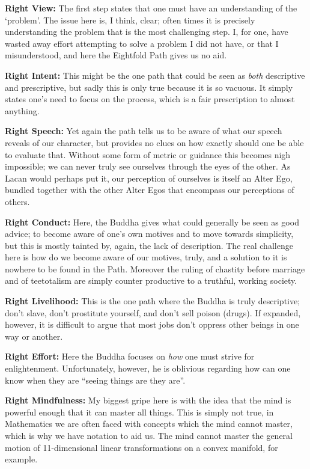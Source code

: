 \documentclass[12pt,letterpaper]{article}
\begin{document}
\begin{spacing}{2}
    \textbf{Right View:} The first step states that one must have an
    understanding of the `problem'. The issue here is, I think, clear; often
    times it is precisely understanding the problem that is the most challenging
    step. I, for one, have wasted away effort attempting to solve a problem I
    did not have, or that I misunderstood, and here the Eightfold Path gives us
    no aid.

    \textbf{Right Intent:} This might be the one path that could be seen as
    \emph{both} descriptive and prescriptive, but sadly this is only true
    because it is so vacuous. It simply states one's need to focus on the
    process, which is a fair prescription to almost anything.

    \textbf{Right Speech:} Yet again the path tells us to be aware of what our
    speech reveals of our character, but provides no clues on how exactly should
    one be able to evaluate that. Without some form of metric or guidance this
    becomes nigh impossible; we can never truly see ourselves through the eyes
    of the other. As Lacan would perhaps put it, our perception of ourselves is
    itself an Alter Ego, bundled together with the other Alter Egos that
    encompass our perceptions of others.

    \textbf{Right Conduct:} Here, the Buddha gives what could generally be seen
    as good advice; to become aware of one's own motives and to move towards
    simplicity, but this is mostly tainted by, again, the lack of description.
    The real challenge here is how do we become aware of our motives, truly, and
    a solution to it is nowhere to be found in the Path. Moreover the
    ruling of chastity before marriage and of teetotalism are simply counter
    productive to a truthful, working society.

    \textbf{Right Livelihood:} This is the one path where the Buddha is truly
    descriptive; don't slave, don't prostitute yourself, and don't sell poison
    (drugs). If expanded, however, it is difficult to argue that most jobs don't
    oppress other beings in one way or another.

    \textbf{Right Effort:} Here the Buddha focuses on \emph{how} one must strive
    for enlightenment. Unfortunately, however, he is oblivious regarding how can
    one know when they are ``seeing things are they are''.

    \textbf{Right Mindfulness:} My biggest gripe here is with the idea that the
    mind is powerful enough that it can master all things. This is simply not
    true, in Mathematics we are often faced with concepts which the mind cannot
    master, which is why we have notation to aid us. The mind cannot master the
    general motion of 11-dimensional linear transformations on a convex
    manifold, for example.


\end{spacing}
\end{document}
